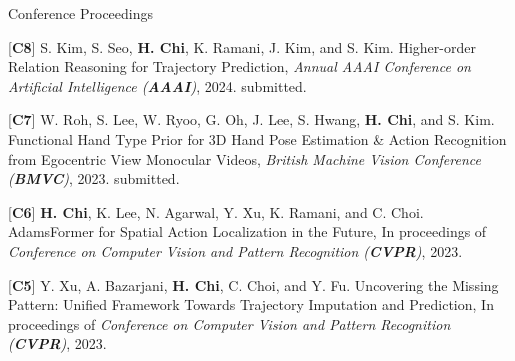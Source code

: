 


\begin{cventries}
\cvpub
{Conference Proceedings} %
{ %
\begin{cvitems}
    \item {[\textbf{C8}] S. Kim, S. Seo, \textbf{H. Chi}, K. Ramani, J. Kim, and S. Kim. Higher-order Relation Reasoning for Trajectory Prediction, \textit{Annual AAAI Conference on Artificial Intelligence (\textbf{AAAI})}, 2024. submitted.}
    \item {[\textbf{C7}] W. Roh, S. Lee, W. Ryoo, G. Oh, J. Lee, S. Hwang, \textbf{H. Chi}, and S. Kim. Functional Hand Type Prior for 3D Hand Pose Estimation \& Action Recognition from Egocentric View Monocular Videos, \textit{British Machine Vision Conference (\textbf{BMVC})}, 2023. submitted.}
    \item {[\textbf{C6}] \textbf{H. Chi}, K. Lee, N. Agarwal, Y. Xu, K. Ramani, and C. Choi. AdamsFormer for Spatial Action Localization in the Future, In proceedings of \textit{Conference on Computer Vision and Pattern Recognition (\textbf{CVPR})}, 2023.}
    \item {[\textbf{C5}] Y. Xu, A. Bazarjani, \textbf{H. Chi}, C. Choi, and Y. Fu. Uncovering the Missing Pattern: Unified Framework Towards Trajectory Imputation and Prediction, In proceedings of \textit{Conference on Computer Vision and Pattern Recognition (\textbf{CVPR})}, 2023.}
\end{cvitems}
}


\end{cventries}
